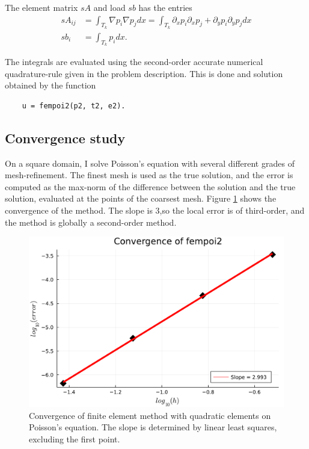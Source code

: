\documentclass[aps, 12pt]{revtex4}
\begin{document}
The element matrix $sA$ and load $sb$ has the entries
\begin{align*}
    sA_{ij} & = \int_{T_k}\nabla p_i \nabla p_jdx = \int_{T_k}\partial_xp_i\partial_xp_j+\partial_yp_i\partial_yp_jdx \\
    sb_i    & = \int_{T_k}p_idx.
\end{align*}

The integrals are evaluated using the second-order accurate numerical quadrature-rule given in the problem description. This is done and solution obtained by the function
\begin{verbatim}
    u = fempoi2(p2, t2, e2).
\end{verbatim}

\subsection{Convergence study}
On a square domain, I solve Poisson's equation with several different grades of mesh-refinement. The finest mesh is used as the true solution, and the error is computed as the max-norm of the difference between the solution and the true solution, evaluated at the points of the coarsest mesh. Figure \ref{fig:conv_fempoi2} shows the convergence of the method. The slope is 3,so the local error is of third-order, and the method is globally a second-order method.


\begin{figure}[b]
    \includegraphics[width=\linewidth]{fempoi2_convergence.pdf}
    \caption{Convergence of finite element method with quadratic elements on Poisson's equation. The slope is determined by linear least squares, excluding the first point.}
    \label{fig:conv_fempoi2}
\end{figure}
\end{document}
